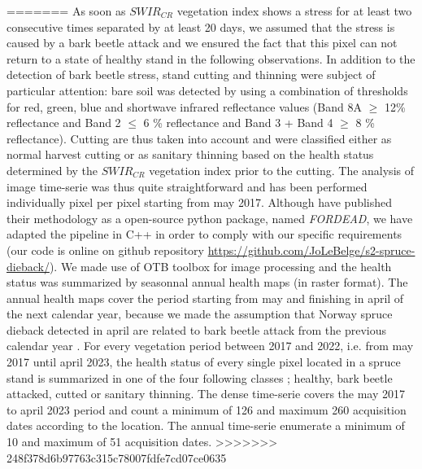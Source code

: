 \documentclass[3p,procedia]{elsarticle}
\begin{document}
=======
As soon as $SWIR_{CR}$ vegetation index shows a stress for at least two consecutive times separated by at least 20 days, we assumed that the stress is caused by a bark beetle attack and we ensured the fact that this pixel can not return to a state of healthy stand in the following observations.
In addition to the detection of bark beetle stress, stand cutting and thinning were subject of particular attention: 
bare soil was detected by using a combination of thresholds for red, green, blue and shortwave infrared reflectance values (Band 8A $\geq$ 12\% reflectance and Band 2 $\leq$ 6 \% reflectance and Band 3 + Band 4 $\geq$ 8 \% reflectance).
Cutting are thus taken into account and were classified either as normal harvest cutting or as sanitary thinning based on the health status determined by the $SWIR_{CR}$ vegetation index prior to the cutting.
The analysis of image time-serie was thus quite straightforward and has been performed individually pixel per pixel starting from may 2017.%
Although \cite{dutrieux_package_2021} have published their methodology as a open-source python package, named \textit{FORDEAD}, we have adapted the pipeline in C++ in order to comply with our specific requirements (our code is online on github repository \url{https://github.com/JoLeBelge/s2-spruce-dieback/}). 
We made use of OTB toolbox \citep{grizonnet_2017_OTB} for image processing and the health status was summarized by seasonnal annual health maps (in raster format).
The annual health maps cover the period starting from may and finishing in april of the next calendar year, because we made the assumption that Norway spruce dieback detected in april are related to bark beetle attack from the previous calendar year \citep{muller_features_2022}.
For every vegetation period between 2017 and 2022, i.e. from may 2017 until april 2023, the health status of every single pixel located in a spruce stand is summarized in one of the four following classes ; healthy, bark beetle attacked, cutted or sanitary thinning.
The dense time-serie covers the may 2017 to april 2023 period and count a minimum of 126 and maximum 260 acquisition dates according to the location. 
The annual time-serie enumerate a minimum of 10 and maximum of 51 acquisition dates.
>>>>>>> 248f378d6b97763c315c78007fdfe7cd07ce0635
\end{document}
